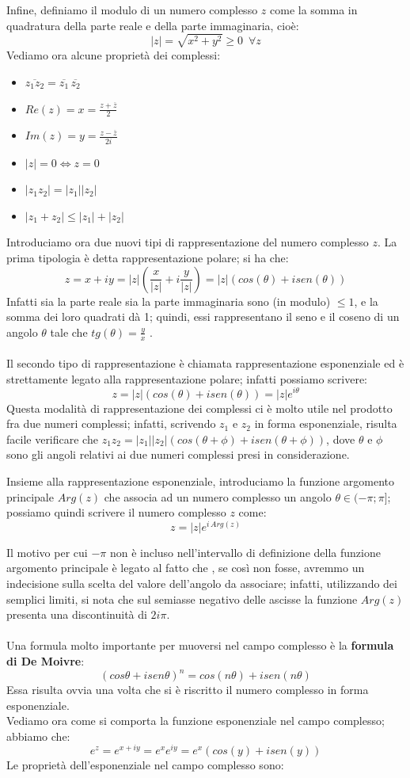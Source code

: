 Infine, definiamo il modulo di un numero complesso $z$ come la somma in quadratura della parte reale e della parte immaginaria, cioè:
$$|z|=\sqrt{x^2+y^2}\geq0 \, \, \, \forall z$$
\clearpage
Vediamo ora alcune proprietà dei complessi:
\begin{itemize}
\item $\overline{z_1 z_2}=\overline{z_1} \, \overline{z_2}$
\item $Re(z)=x=\frac{z+\overline{z}}{2}$
\item $Im(z)=y=\frac{z-\overline{z}}{2i}$
\item $|z|=0 \iff z=0$
\item $|z_1 z_2|=|z_1| |z_2|$
\item $|z_1 + z_2| \leq |z_1| + |z_2|$
\end{itemize}
Introduciamo ora due nuovi tipi di rappresentazione del numero complesso $z$. La prima tipologia è detta rappresentazione polare; si ha che:
$$z=x+iy=|z| \left(\frac{x}{|z|}+i \frac{y}{|z|} \right) =|z|(cos(\theta) +i sen(\theta))$$
Infatti sia la parte reale sia la parte immaginaria sono (in modulo) $\leq 1$, e la somma dei loro quadrati dà 1; quindi,  essi rappresentano il seno e il coseno di un angolo $\theta$ tale che $tg(\theta)=\frac{y}{x}$ .
\\
\\
Il secondo tipo di rappresentazione è chiamata rappresentazione esponenziale ed è strettamente legato alla rappresentazione polare; infatti possiamo scrivere:
$$z=|z| (cos(\theta) +i sen(\theta))=|z| e^{i \theta}$$
Questa modalità di rappresentazione dei complessi ci è molto utile nel prodotto fra due numeri complessi; infatti, scrivendo $z_1$ e $z_2$ in forma esponenziale, risulta facile verificare che $z_1 z_2=|z_1||z_2|(cos(\theta + \phi) +i sen(\theta + \phi))$, dove $\theta$ e $\phi$ sono gli angoli relativi ai due numeri complessi presi in considerazione.

Insieme alla rappresentazione esponenziale, introduciamo la funzione argomento principale $Arg(z)$ che associa ad un numero complesso un angolo $\theta \in (-\pi;\pi]$; possiamo quindi scrivere il numero complesso $z$ come:
$$z=|z| e^{i \, Arg(z)}$$

Il motivo per cui $-\pi$ non è incluso nell'intervallo di definizione della funzione argomento principale è legato al fatto che , se così non fosse, avremmo un indecisione sulla scelta del valore dell'angolo da associare; infatti, utilizzando dei semplici limiti, si nota che sul semiasse negativo delle ascisse la funzione $Arg(z)$ presenta una discontinuità di $2i\pi$.
\\
\\
Una formula molto importante per muoversi nel campo complesso è la \textbf{formula di De Moivre}:
$$(cos\theta + i sen\theta)^n =cos(n\theta) + i sen(n\theta)$$
Essa risulta ovvia una volta che si è riscritto il numero complesso in forma esponenziale.\\Vediamo ora come si comporta la funzione esponenziale nel campo complesso; abbiamo che:
$$e^z=e^{x+iy}=e^x e^{iy} =e^x (cos(y)+isen(y))$$
Le proprietà dell'esponenziale nel campo complesso sono:

